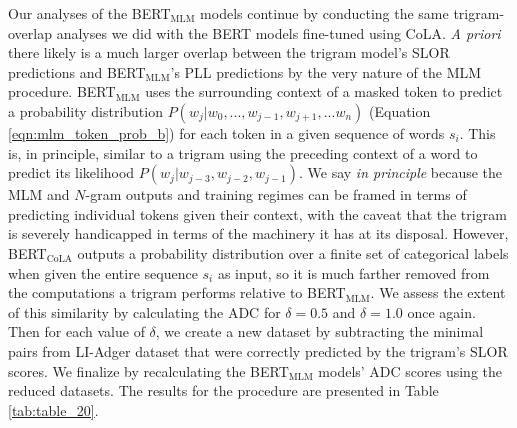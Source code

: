 Our analyses of the BERT$_{\mathrm{MLM}}$ models continue by conducting the same trigram-overlap analyses we did with the BERT models fine-tuned using CoLA.  \textit{A priori} there likely is a much larger overlap between the trigram model's SLOR predictions and BERT$_{\mathrm{MLM}}$'s PLL predictions by the very nature of the MLM procedure.  BERT$_{\mathrm{MLM}}$ uses the surrounding context of a masked token to predict a probability distribution $P(w_j|w_0,...,w_{j-1},w_{j+1},...w_n)$ (Equation \ref{eqn:mlm_token_prob_b}) for each token in a given sequence of words $s_i$.  This is, in principle, similar to a trigram using the preceding context of a word to predict its likelihood $P(w_j|w_{j-3},w_{j-2},w_{j-1})$.  We say \textit{in principle} because the MLM and $N$-gram outputs and training regimes can be framed in terms of predicting individual tokens given their context, with the caveat that the trigram is severely handicapped in terms of the machinery it has at its disposal.  However, BERT$_{\mathrm{CoLA}}$ outputs a probability distribution over a finite set of categorical labels when given the entire sequence $s_i$ as input, so it is much farther removed from the computations a trigram performs relative to BERT$_{\mathrm{MLM}}$.  We assess the extent of this similarity by calculating the ADC for $\delta=0.5$ and $\delta=1.0$ once again.  Then for each value of $\delta$, we create a new dataset by subtracting the minimal pairs from LI-Adger dataset that were correctly predicted by the trigram's SLOR scores.  We finalize by recalculating the BERT$_{\mathrm{MLM}}$ models' ADC scores using the reduced datasets.  The results for the procedure are presented in Table \ref{tab:table_20}.


